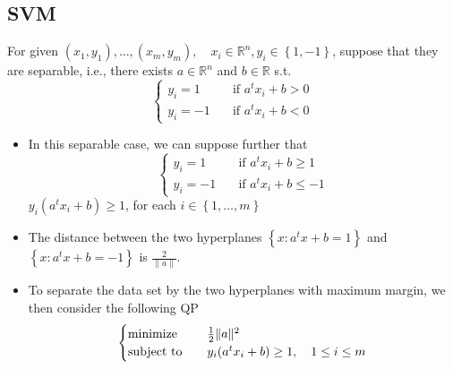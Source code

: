 \subsection{SVM}
\begin{remark}
    For given $(x_1, y_1), \dots, (x_m, y_m), \quad x_i \in \mathbb{R}^n, y_i \in \left\{1, -1\right\}$, suppose that they are separable, i.e., there exists $a \in \mathbb{R}^n$ and $b \in \mathbb{R}$ s.t.\[\begin{cases}
        y_i = 1 \quad &\text{if } a^tx_i + b > 0\\
        y_i = -1 \quad &\text{if } a^tx_i + b < 0
    \end{cases}\]
    \begin{itemize}
        \item In this separable case, we can suppose further that\[\begin{cases}
            y_i = 1 \quad &\text{if } a^tx_i + b \ge 1\\
            y_i = -1 \quad &\text{if } a^tx_i + b \le -1
        \end{cases}\]
        $y_i(a^tx_i + b) \ge 1$, for each $i \in \left\{1, \dots, m\right\}$
        \item The distance between the two hyperplanes $\left\{x:a^tx + b = 1\right\}$ and $\left\{x : a^tx + b = -1\right\}$ is $\frac{2}{\|a\|}$.
        \item To separate the data set by the two hyperplanes with maximum margin, we then consider the following QP\[\begin{cases}
            \operatorname{minimize} \quad &\frac{1}{2}\|a\|^2\\
            \operatorname{subject\ to} \quad &y_i(a^tx_i + b) \ge 1, \quad 1 \le i \le m
        \end{cases}\]
    \end{itemize}
\end{remark}

